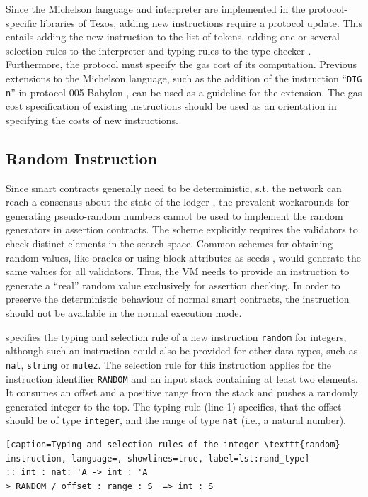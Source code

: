 Since the Michelson language and interpreter are implemented in the protocol-specific libraries of Tezos, adding new instructions require a protocol update. This entails adding the new instruction to the list of tokens, adding one or several selection rules to the interpreter and typing rules to the type checker \cite{tezos_repo}. Furthermore, the protocol must specify the gas cost of its computation. Previous extensions to the Michelson language, such as the addition of the instruction ``\texttt{DIG n}'' in protocol 005 Babylon \cite{tezos_michelson_ext}, can be used as a guideline for the extension. The gas cost specification of existing instructions \cite{tezos_repo_gas} should be used as an orientation in specifying the costs of new instructions.

\subsection{Random Instruction}\label{sec:random}
Since smart contracts generally need to be deterministic, s.t. the network can reach a consensus about the state of the ledger \cite{chatterjee_probabilistic_2019}, the prevalent workarounds for generating pseudo-random numbers cannot be used to implement the random generators in assertion contracts. The scheme explicitly requires the validators to check distinct elements in the search space. Common schemes for obtaining random values, like oracles or using block attributes as seeds \cite{chatterjee_probabilistic_2019}, would generate the same values for all validators. Thus, the VM needs to provide an instruction to generate a ``real'' random value exclusively for assertion checking. In order to preserve the deterministic behaviour of normal smart contracts, the instruction should not be available in the normal execution mode.

 specifies the typing and selection rule of a new instruction \texttt{random} for integers, although such an instruction could also be provided for other data types, such as \texttt{nat}, \texttt{string} or \texttt{mutez}. The selection rule for this instruction applies for the instruction identifier \texttt{RANDOM} and an input stack containing at least two elements. It consumes an offset and a positive range from the stack and pushes a randomly generated integer to the top. The typing rule (line 1) specifies, that the offset should be of type \texttt{integer}, and the range of type \texttt{nat} (i.e., a natural number).
\lstset{upquote=true}
\begin{lstlisting}[caption=Typing and selection rules of the integer \texttt{random} instruction, language=, showlines=true, label=lst:rand_type]
:: int : nat: 'A -> int : 'A
> RANDOM / offset : range : S  => int : S
\end{lstlisting}

